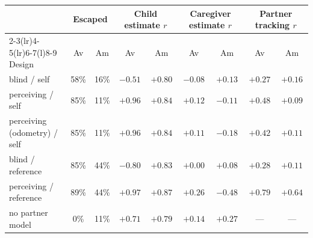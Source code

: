 \begin{tabular}{@{}lcccccccc@{}}
\toprule
 & \multicolumn{2}{c}{Escaped} & \multicolumn{2}{c}{Child estimate $r$} & \multicolumn{2}{c}{Caregiver estimate $r$} & \multicolumn{2}{c}{Partner tracking $r$} \\
\cmidrule(lr){2-3}\cmidrule(lr){4-5}\cmidrule(lr){6-7}\cmidrule(l){8-9}
Design & Av & Am & Av & Am & Av & Am & Av & Am \\
\midrule
blind / self & 58\% & 16\% & $-0.51$ & $+0.80$ & $-0.08$ & $+0.13$ & $+0.27$ & $+0.16$ \\
perceiving / self & 85\% & 11\% & $+0.96$ & $+0.84$ & $+0.12$ & $-0.11$ & $+0.48$ & $+0.09$ \\
perceiving (odometry) / self & 85\% & 11\% & $+0.96$ & $+0.84$ & $+0.11$ & $-0.18$ & $+0.42$ & $+0.11$ \\
blind / reference & 85\% & 44\% & $-0.80$ & $+0.83$ & $+0.00$ & $+0.08$ & $+0.28$ & $+0.11$ \\
perceiving / reference & 89\% & 44\% & $+0.97$ & $+0.87$ & $+0.26$ & $-0.48$ & $+0.79$ & $+0.64$ \\
no partner model & 0\% & 11\% & $+0.71$ & $+0.79$ & $+0.14$ & $+0.27$ & --- & --- \\
\bottomrule
\end{tabular}
